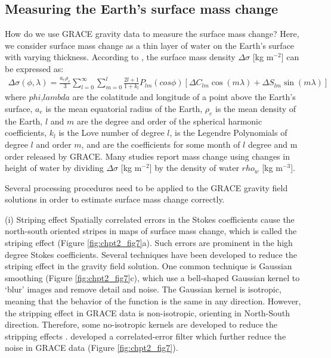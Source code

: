 \subsection{Measuring the Earth's surface mass change}
How do we use GRACE gravity data to measure the surface mass change?  Here, we consider surface mass change as a thin layer of water on the Earth’s surface with varying thickness.  According to \citet{wahr1998chpt2}, the surface mass density $\Delta \sigma$ [kg m$^{-2}$] can be expressed as:
\begin{equation} \label{eq:chpt2_eq6}
\begin{aligned}
\Delta \sigma(\phi,\lambda) = \frac{a_{e} \rho_{e}}{3} \sum_{l=0}^{\infty} \sum_{m=0}^{l} \frac{2l+1}{1+k_{l}} P_{lm} (cos \phi) [\Delta C_{lm}\cos(m\lambda)+\Delta S_{lm}\sin(m \lambda)]
\end{aligned}
\end{equation}
where $phi$,$lambda$ are the colatitude and longitude of a point above the Earth’s surface, $a_{e}$ is the mean equatorial radius of the Earth, $\rho_{e}$ is the mean density of the Earth, $l$ and $m$ are the degree and order of the spherical harmonic coefficients, $k_{l}$ is the Love number of degree $l$,   is the Legendre Polynomials of degree $l$ and order $m$,   and  are the coefficients for some month of $l$ degree and m order released by GRACE.  Many studies report mass change using changes in height of water by dividing $\Delta \sigma$ [kg m$^{-2}$] by the density of water $rho_{w}$ [kg m$^{-3}$].

Several processing procedures need to be applied to the GRACE gravity field solutions in order to estimate surface mass change correctly.  

(i) Striping effect
Spatially correlated errors in the Stokes coefficients cause the north-south oriented stripes in maps of surface mass change, which is called the striping effect (Figure \ref{fig:chpt2_fig7}a).  Such errors are prominent in the high degree Stokes coefficients.  Several techniques have been developed to reduce the striping effect in the gravity field solution.  One common technique is Gaussian smoothing (Figure \ref{fig:chpt2_fig7}c), which use a bell-shaped Gaussian kernel to ‘blur’ images and remove detail and noise.  The Gaussian kernel is isotropic, meaning that the behavior of the function is the same in any direction.  However, the stripping effect in GRACE data is non-isotropic, orienting in North-South direction.  Therefore, some no-isotropic kernels are developed to reduce the stripping effects \cite[e.g.,][]{chen2006chpt2,kusche2009chpt2}.  \citet{swenson2006chpt2} developed a correlated-error filter which further reduce the noise in GRACE data (Figure \ref{fig:chpt2_fig7}).  

